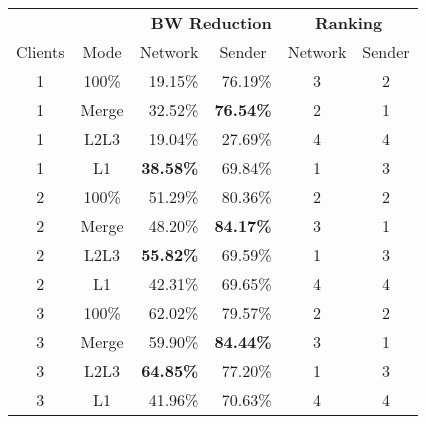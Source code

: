 \begin{table}[]
\centering
\begin{tabular}{@{}ccrrcc@{}}
\toprule
        &                          & \multicolumn{2}{r}{\textbf{BW Reduction}}                & \multicolumn{2}{c}{\textbf{Ranking}} \\
        \cmidrule(lr){3-4}\cmidrule(lr){5-6}
Clients & \multicolumn{1}{c}{Mode} & \multicolumn{1}{c}{Network} & \multicolumn{1}{c}{Sender} & Network       & Sender      \\ \midrule
1       & 100\%                    & 19.15\%                    & 76.19\%                   & 3             & 2           \\
1       & Merge                    & 32.52\%                    & \textbf{76.54\%}          & 2             & 1           \\
1       & L2L3                     & 19.04\%                    & 27.69\%                   & 4             & 4           \\
1       & L1                       & \textbf{38.58\%}           & 69.84\%                   & 1             & 3           \\ \midrule
2       & 100\%                    & 51.29\%                    & 80.36\%                   & 2             & 2           \\
2       & Merge                    & 48.20\%                    & \textbf{84.17\%}          & 3             & 1           \\
2       & L2L3                     & \textbf{55.82\%}           & 69.59\%                   & 1             & 3           \\
2       & L1                       & 42.31\%                    & 69.65\%                   & 4             & 4           \\ \midrule
3       & 100\%                    & 62.02\%                    & 79.57\%                   & 2             & 2           \\
3       & Merge                    & 59.90\%                    & \textbf{84.44\%}          & 3             & 1           \\
3       & L2L3                     & \textbf{64.85\%}           & 77.20\%                   & 1             & 3           \\
3       & L1                       & 41.96\%                    & 70.63\%                   & 4             & 4           \\ \midrule

\end{tabular}
\end{table}

